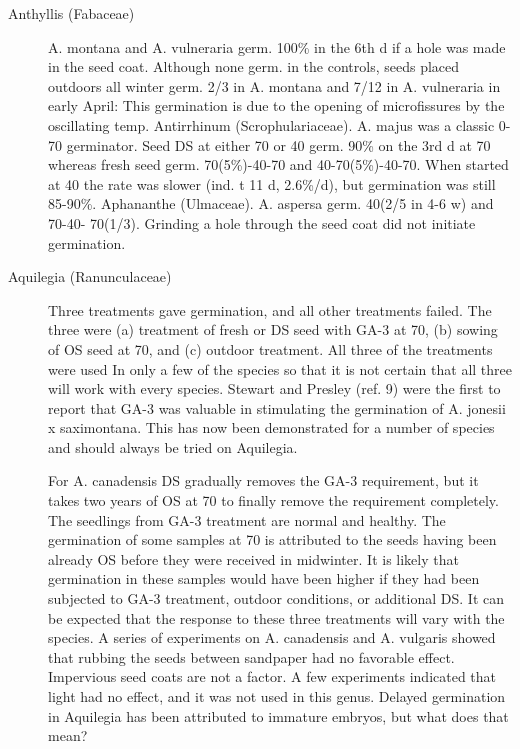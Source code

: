 \begin{description}
\item[Anthyllis (Fabaceae)] A. montana and A. vulneraria germ. 100\% in the 6th
d if a hole was made in the seed coat. Although none germ. in the controls, seeds
placed outdoors all winter germ. 2/3 in A. montana and 7/12 in A. vulneraria in early
April: This germination is due to the opening of microfissures by the oscillating temp.
Antirrhinum (Scrophulariaceae). A. majus was a classic 0-70 germinator.
Seed DS at either 70 or 40 germ. 90\% on the 3rd d at 70 whereas fresh seed germ.
70(5\%)-40-70 and 40-70(5\%)-40-70. When started at 40 the rate was slower (ind. t 11
d, 2.6\%/d), but germination was still 85-90\%.
Aphananthe (Ulmaceae). A. aspersa germ. 40(2/5 in 4-6 w) and 70-40-
70(1/3). Grinding a hole through the seed coat did not initiate germination.

\item[Aquilegia (Ranunculaceae)] Three treatments gave germination, and all
other treatments failed. The three were (a) treatment of fresh or DS seed with GA-3 at
70, (b) sowing of OS seed at 70, and (c) outdoor treatment. All three of the treatments
were used In only a few of the species so that it is not certain that all three will work
with every species. Stewart and Presley (ref. 9) were the first to report that GA-3 was
valuable in stimulating the germination of A. jonesii x saximontana. This has now
been demonstrated for a number of species and should always be tried on Aquilegia.

For A. canadensis DS gradually removes the GA-3 requirement, but it takes two years
of OS at 70 to finally remove the requirement completely. The seedlings from GA-3
treatment are normal and healthy. The germination of some samples at 70 is
attributed to the seeds having been already OS before they were received in
midwinter. It is likely that germination in these samples would have been higher if they
had been subjected to GA-3 treatment, outdoor conditions, or additional DS. It can be
expected that the response to these three treatments will vary with the species. A
series of experiments on A. canadensis and A. vulgaris showed that rubbing the seeds
between sandpaper had no favorable effect. Impervious seed coats are not a factor. A
few experiments indicated that light had no effect, and it was not used in this genus.
Delayed germination in Aquilegia has been attributed to immature embryos, but what
does that mean?


\end{description}
